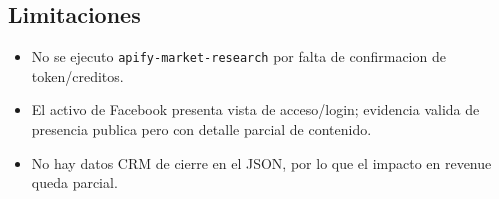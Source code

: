 \documentclass[9pt,a4paper,twocolumn,twoside]{tau-class/tau}
\begin{document}
\subsection{Limitaciones}
\begin{itemize}
  \item No se ejecuto \texttt{apify-market-research} por falta de confirmacion de token/creditos.
  \item El activo de Facebook presenta vista de acceso/login; evidencia valida de presencia publica pero con detalle parcial de contenido.
  \item No hay datos CRM de cierre en el JSON, por lo que el impacto en revenue queda parcial.
\end{itemize}
\end{document}
